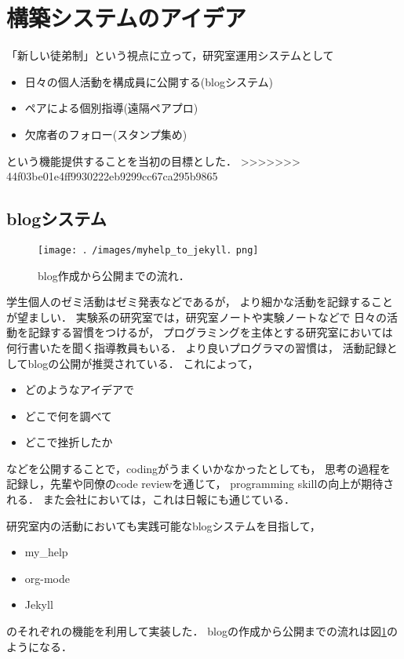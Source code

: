 \documentclass{hissymp}
\begin{document}
\section{構築システムのアイデア}
\label{sec:org92cd326}
「新しい徒弟制」という視点に立って，研究室運用システムとして
\begin{itemize}
\item 日々の個人活動を構成員に公開する(blogシステム)
\item ペアによる個別指導(遠隔ペアプロ)
\item 欠席者のフォロー(スタンプ集め)
\end{itemize}
という機能提供することを当初の目標とした．
>>>>>>> 44f03be01e4ff9930222eb9299cc67ca295b9865

\subsection{blogシステム}
\label{sec:org4389258}

\begin{figure}[htbp]
\centering
\texttt{[image: ．/images/myhelp\_to\_jekyll．png]}
\caption{\label{fig:org0844ebd}
blog作成から公開までの流れ．}
\end{figure}

学生個人のゼミ活動はゼミ発表などであるが，
より細かな活動を記録することが望ましい．
実験系の研究室では，研究室ノートや実験ノートなどで
日々の活動を記録する習慣をつけるが，
プログラミングを主体とする研究室においては
何行書いたを聞く指導教員もいる．
より良いプログラマの習慣は，
活動記録としてblogの公開が推奨されている．
これによって，
\begin{itemize}
\item どのようなアイデアで
\item どこで何を調べて
\item どこで挫折したか
\end{itemize}
などを公開することで，codingがうまくいかなかったとしても，
思考の過程を記録し，先輩や同僚のcode reviewを通じて，
programming skillの向上が期待される．
また会社においては，これは日報にも通じている．

研究室内の活動においても実践可能なblogシステムを目指して，
\begin{itemize}
\item my\_help
\item org-mode
\item Jekyll
\end{itemize}
のそれぞれの機能を利用して実装した．
blogの作成から公開までの流れは図\ref{fig:org0844ebd}のようになる．
\end{document}
